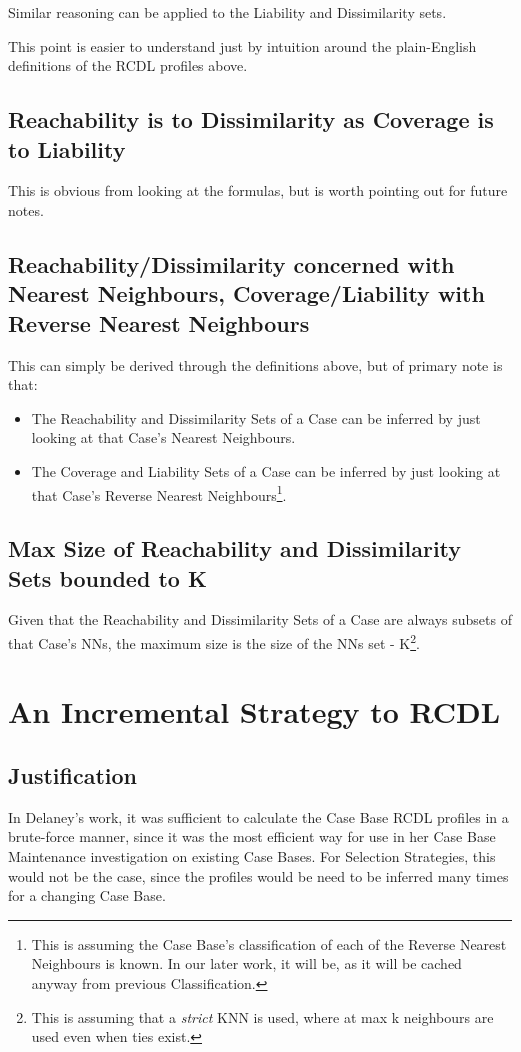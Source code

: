 \documentclass[a4paper,11pt]{report}
\begin{document}
Similar reasoning can be applied to the Liability and Dissimilarity sets.

This point is easier to understand just by intuition around the plain-English definitions of the RCDL profiles above.

\subsection{Reachability is to Dissimilarity as Coverage is to Liability}
This is obvious from looking at the formulas, but is worth pointing out for future notes.

\subsection{Reachability/Dissimilarity concerned with Nearest Neighbours, Coverage/Liability with Reverse Nearest Neighbours \label{sec:RdWithNnClWithRnn}}
This can simply be derived through the definitions above, but of primary note is that:
\begin{itemize}
	\item The Reachability and Dissimilarity Sets of a Case can be inferred by just looking at that Case's Nearest Neighbours.
	\item The Coverage and Liability Sets of a Case can be inferred by just looking at that Case's Reverse Nearest Neighbours\footnote{This is assuming the Case Base's classification of each of the Reverse Nearest Neighbours is known. In our later work, it will be, as it will be cached anyway from previous Classification.}.
\end{itemize}

\subsection{Max Size of Reachability and Dissimilarity Sets bounded to K}
Given that the Reachability and Dissimilarity Sets of a Case are always subsets of that Case's NNs, the maximum size is the size of the NNs set - K\footnote{This is assuming that a \emph{strict} KNN is used, where at max k neighbours are used even when ties exist.}.

\section{An Incremental Strategy to RCDL}
\subsection{Justification} 
In Delaney's work, it was sufficient to calculate the Case Base RCDL profiles in a brute-force manner, since it was the most efficient way for use in her Case Base Maintenance investigation on existing Case Bases. For Selection Strategies, this would not be the case, since the profiles would be need to be inferred many times for a changing Case Base.
\end{document}
